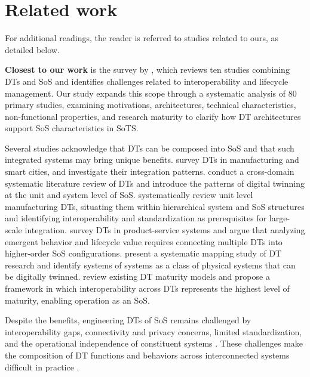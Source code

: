 \section{Related work}\label{sec:literature-review-related-work}

For additional readings, the reader is referred to studies related to ours, as detailed below.

\textbf{Closest to our work} is the survey by \textcite{olsson2023systems-of-systems}, which reviews ten studies combining DTs and SoS and identifies challenges related to interoperability and lifecycle management. Our study expands this scope through a systematic analysis of 80 primary studies, examining motivations, architectures, technical characteristics, non-functional properties, and research maturity to clarify how DT architectures support SoS characteristics in SoTS.

Several studies acknowledge that DTs can be composed into SoS and that such integrated systems may bring unique benefits. \textcite{mylonas2021digital} survey DTs in manufacturing and smart cities, and investigate their integration patterns. \textcite{semeraro2021digital} conduct a cross-domain systematic literature review of DTs and introduce the patterns of digital twinning at the unit and system level of SoS. \textcite{bottjer2023review} systematically review unit level manufacturing DTs, situating them within hierarchical system and SoS structures and identifying interoperability and standardization as prerequisites for large-scale integration. \textcite{bertoni2022designing} survey DTs in product-service systems and argue that analyzing emergent behavior and lifecycle value requires connecting multiple DTs into higher-order SoS configurations. \textcite{dalibor2022cross-domain} present a systematic mapping study of DT research and identify systems of systems as a class of physical systems that can be digitally twinned. \textcite{klar2023digital} review existing DT maturity models and propose a framework in which interoperability across DTs represents the highest level of maturity, enabling operation as an SoS.

Despite the benefits, engineering DTs of SoS remains challenged by interoperability gaps, connectivity and privacy concerns, limited standardization, and the operational independence of constituent systems \cite{michael2022integration,dietz2020digital,borth2019digital}. These challenges make the composition of DT functions and behaviors across interconnected systems difficult in practice \cite{gill2024automating}.